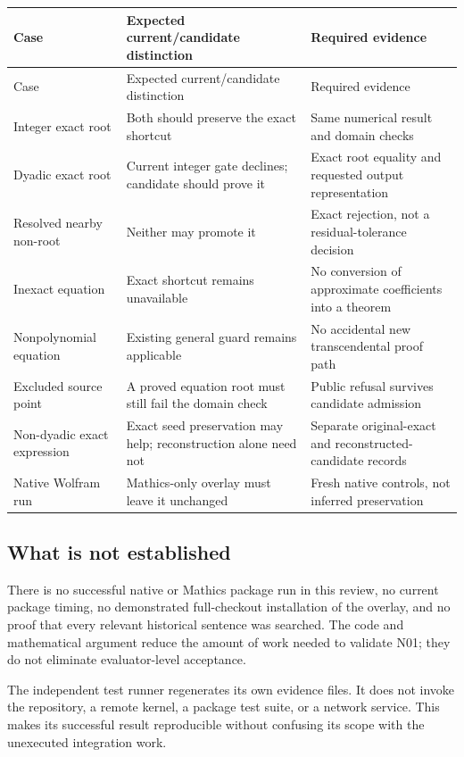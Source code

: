 \documentclass[11pt,letterpaper]{article}
\begin{document}
\begin{longtable}{@{}P{1.82in}P{2.10in}P{2.05in}@{}}
\toprule
Case & Expected current/candidate distinction & Required evidence\\\midrule\endfirsthead
\toprule Case & Expected current/candidate distinction & Required evidence\\\midrule\endhead
Integer exact root & Both should preserve the exact shortcut & Same numerical result and domain checks\\[4pt]
Dyadic exact root & Current integer gate declines; candidate should prove it & Exact root equality and requested output representation\\[4pt]
Resolved nearby non-root & Neither may promote it & Exact rejection, not a residual-tolerance decision\\[4pt]
Inexact equation & Exact shortcut remains unavailable & No conversion of approximate coefficients into a theorem\\[4pt]
Nonpolynomial equation & Existing general guard remains applicable & No accidental new transcendental proof path\\[4pt]
Excluded source point & A proved equation root must still fail the domain check & Public refusal survives candidate admission\\[4pt]
Non-dyadic exact expression & Exact seed preservation may help; reconstruction alone need not & Separate original-exact and reconstructed-candidate records\\[4pt]
Native Wolfram run & Mathics-only overlay must leave it unchanged & Fresh native controls, not inferred preservation\\
\bottomrule
\end{longtable}

\subsection{What is not established}

There is no successful native or Mathics package run in this review, no current package timing, no demonstrated full-checkout installation of the overlay, and no proof that every relevant historical sentence was searched. The code and mathematical argument reduce the amount of work needed to validate N01; they do not eliminate evaluator-level acceptance.

The independent test runner regenerates its own evidence files. It does not invoke the repository, a remote kernel, a package test suite, or a network service. This makes its successful result reproducible without confusing its scope with the unexecuted integration work.
\end{document}
